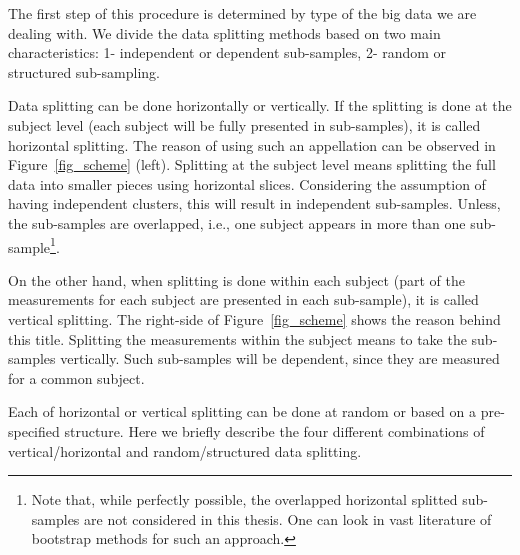 \documentclass[14pt]{article}
\begin{document}
The first step of this procedure is determined by type of the big data we are dealing with. We divide the data splitting methods based on two main characteristics: 1- independent or dependent sub-samples, 2- random or structured sub-sampling.

Data splitting can be done horizontally or vertically. If the splitting is done at the subject level (each subject will be fully presented in sub-samples), it is called horizontal splitting. The reason of using such an appellation can be observed in Figure~\ref{fig_scheme} (left). Splitting at the subject level means splitting the full data into smaller pieces using horizontal slices. Considering the assumption of having independent clusters, this will result in independent sub-samples. Unless, the sub-samples are overlapped, i.e., one subject appears in more than one sub-sample\footnote{Note that, while perfectly possible, the overlapped horizontal splitted sub-samples are not considered in this thesis. One can look in vast literature of bootstrap methods for such an approach.}.

On the other hand, when splitting is done within each subject (part of the measurements for each subject are presented in each sub-sample), it is called vertical splitting. The right-side of Figure~\ref{fig_scheme} shows the reason behind this title. Splitting the measurements within the subject means to take the sub-samples vertically. Such sub-samples will be dependent, since they are measured for a common subject.

Each of horizontal or vertical splitting can be done at random or based on a pre-specified structure.  Here we briefly describe the four different combinations of vertical/horizontal and random/structured data splitting.
\end{document}
